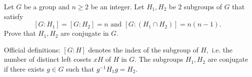 Let $G$ be a group and $n \ge 2$ be an integer. Let $H_1, H_2$ be $2$ subgroups of $G$ that satisfy $$[G: H_1] = [G: H_2] = n \text{ and } [G: (H_1 \cap H_2)] = n(n-1).$$Prove that $H_1, H_2$ are conjugate in $G.$

Official definitions: $[G:H]$ denotes the index of the subgroup of $H,$ i.e. the number of distinct left cosets $xH$ of $H$ in $G.$ The subgroups $H_1, H_2$ are conjugate if there exists $g \in G$ such that $g^{-1} H_1 g = H_2.$
